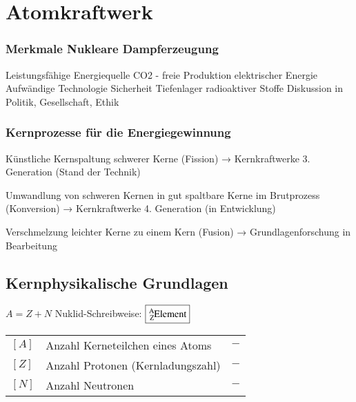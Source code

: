 \section{Atomkraftwerk}

\subsubsection{Merkmale Nukleare Dampferzeugung}

\begin{outline}
  \1 Leistungsfähige Energiequelle
  \1 CO2 - freie Produktion elektrischer Energie
  \1 Aufwändige Technologie
  \1 Sicherheit
  \1 Tiefenlager radioaktiver Stoffe
  \1 Diskussion in Politik, Gesellschaft, Ethik
\end{outline}


\subsubsection{Kernprozesse für die Energiegewinnung}

\begin{outline}
  \1 Künstliche Kernspaltung schwerer Kerne (Fission)
    \2 → Kernkraftwerke 3. Generation
    \2 (Stand der Technik)
    
  \1 Umwandlung von schweren Kernen in gut spaltbare Kerne im Brutprozess (Konversion)
    \2 → Kernkraftwerke 4. Generation
    \2 (in Entwicklung)
    
  \1 Verschmelzung leichter Kerne zu einem Kern (Fusion)
    \2 → Grundlagenforschung in Bearbeitung
\end{outline}


\subsection{Kernphysikalische Grundlagen}

$\boxed{A = Z + N}$ \quad Nuklid-Schreibweise: $\boxed{\text{\ce{^{A}_{Z}Element}} }$ \quad {} \quad {}

\vspace{1em}
\renewcommand{\arraystretch}{1.2}
\begin{tabular}{@{} l p{6cm} l @{}}
    $[A]$ & Anzahl Kerneteilchen eines Atoms \dotfill & $-$ \\
    $[Z]$ & Anzahl Protonen (Kernladungszahl) \dotfill & $-$ \\
    $[N]$ & Anzahl Neutronen \dotfill & $-$ \\
\end{tabular}



